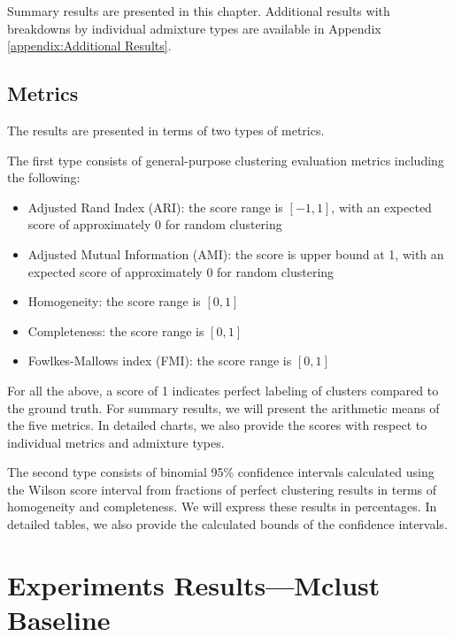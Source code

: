 Summary results are presented in this chapter. Additional results with breakdowns by individual admixture types are available in Appendix \ref{appendix:Additional Results}.

\FloatBarrier
\subsection{Metrics}

The results are presented in terms of two types of metrics.

The first type consists of general-purpose clustering evaluation metrics including the following:

\begin{itemize}
  \item Adjusted Rand Index (ARI): the score range is $[-1, 1]$, with an expected score of approximately 0 for random clustering
  \item Adjusted Mutual Information (AMI): the score is upper bound at 1, with an expected score of approximately 0 for random clustering
  \item Homogeneity: the score range is $[0, 1]$
  \item Completeness: the score range is $[0, 1]$
  \item Fowlkes-Mallows index (FMI): the score range is $[0, 1]$
\end{itemize}

For all the above, a score of 1 indicates perfect labeling of clusters compared to the ground truth. For summary results, we will present the arithmetic means of the five metrics. In detailed charts, we also provide the scores with respect to individual metrics and admixture types.

The second type consists of binomial 95\% confidence intervals calculated using the Wilson score interval from fractions of perfect clustering results in terms of homogeneity and completeness. We will express these results in percentages. In detailed tables, we also provide the calculated bounds of the confidence intervals.

\section{Experiments Results---Mclust Baseline}

